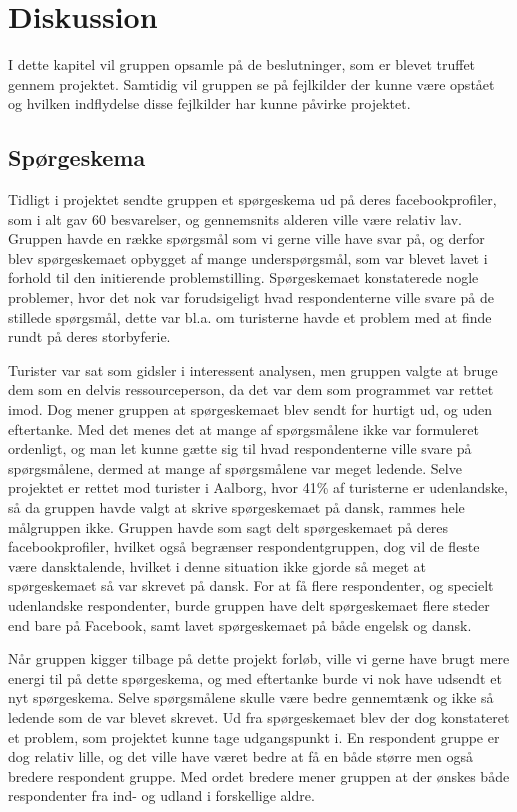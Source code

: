 \chapter{Diskussion}
I dette kapitel vil gruppen opsamle på de beslutninger, som er blevet truffet gennem projektet.  Samtidig vil gruppen se på fejlkilder der kunne være opstået og hvilken indflydelse disse fejlkilder har kunne påvirke projektet. 
\section{Spørgeskema}
Tidligt i projektet sendte gruppen et spørgeskema ud på deres facebookprofiler, som i alt gav 60 besvarelser, og gennemsnits alderen ville være relativ lav. Gruppen havde en række spørgsmål som vi gerne ville have svar på, og derfor blev spørgeskemaet opbygget af mange underspørgsmål, som var blevet lavet i forhold til den initierende problemstilling. Spørgeskemaet konstaterede nogle problemer, hvor det nok var forudsigeligt hvad respondenterne ville svare på de stillede spørgsmål, dette var bl.a. om turisterne havde et problem med at finde rundt på deres storbyferie.

Turister var sat som gidsler i interessent analysen, men gruppen valgte at bruge dem som en delvis ressourceperson, da det var dem som programmet var rettet imod. Dog mener gruppen at spørgeskemaet blev sendt for hurtigt ud, og uden eftertanke. Med det menes det at mange af spørgsmålene ikke var formuleret ordenligt, og man let kunne gætte sig til hvad respondenterne ville svare på spørgsmålene, dermed at mange af spørgsmålene var meget ledende. Selve projektet er rettet mod turister i Aalborg, hvor 41\% af turisterne er udenlandske, så da gruppen havde valgt at skrive spørgeskemaet på dansk, rammes hele målgruppen ikke. Gruppen havde som sagt delt spørgeskemaet på deres facebookprofiler, hvilket også begrænser respondentgruppen, dog vil de fleste være dansktalende, hvilket i denne situation ikke gjorde så meget at spørgeskemaet så var skrevet på dansk. For at få flere respondenter, og specielt udenlandske respondenter, burde gruppen have delt spørgeskemaet flere steder end bare på Facebook, samt lavet spørgeskemaet på både engelsk og dansk. 

Når gruppen kigger tilbage på dette projekt forløb, ville vi gerne have brugt mere energi til på dette spørgeskema, og med eftertanke burde vi nok have udsendt et nyt spørgeskema. Selve spørgsmålene skulle være bedre gennemtænk og ikke så ledende som de var blevet skrevet. Ud fra spørgeskemaet blev der dog konstateret et problem, som projektet kunne tage udgangspunkt i. En respondent gruppe er dog relativ lille, og det ville have været bedre at få en både større men også bredere respondent gruppe. Med ordet bredere mener gruppen at der ønskes både respondenter fra ind- og udland i forskellige aldre.
